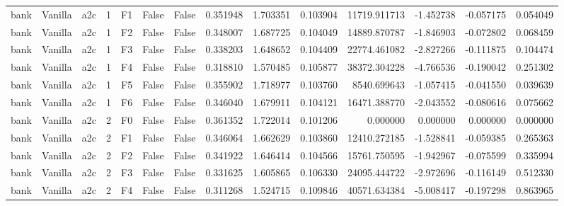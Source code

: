 \begin{tabular}{lllrlllrrrrrrr}
      bank & Vanilla &       a2c &     1 &  F1 &           False &            False &  0.351948 &  1.703351 & 0.103904 &     11719.911713 &          -1.452738 &       -0.057175 &            0.054049 \\
      bank & Vanilla &       a2c &     1 &  F2 &           False &            False &  0.348007 &  1.687725 & 0.104049 &     14889.870787 &          -1.846903 &       -0.072802 &            0.068459 \\
      bank & Vanilla &       a2c &     1 &  F3 &           False &            False &  0.338203 &  1.648652 & 0.104409 &     22774.461082 &          -2.827266 &       -0.111875 &            0.104474 \\
      bank & Vanilla &       a2c &     1 &  F4 &           False &            False &  0.318810 &  1.570485 & 0.105877 &     38372.304228 &          -4.766536 &       -0.190042 &            0.251302 \\
      bank & Vanilla &       a2c &     1 &  F5 &           False &            False &  0.355902 &  1.718977 & 0.103760 &      8540.699643 &          -1.057415 &       -0.041550 &            0.039639 \\
      bank & Vanilla &       a2c &     1 &  F6 &           False &            False &  0.346040 &  1.679911 & 0.104121 &     16471.388770 &          -2.043552 &       -0.080616 &            0.075662 \\
      bank & Vanilla &       a2c &     2 &  F0 &           False &            False &  0.361352 &  1.722014 & 0.101206 &         0.000000 &           0.000000 &        0.000000 &            0.000000 \\
      bank & Vanilla &       a2c &     2 &  F1 &           False &            False &  0.346064 &  1.662629 & 0.103860 &     12410.272185 &          -1.528841 &       -0.059385 &            0.265363 \\
      bank & Vanilla &       a2c &     2 &  F2 &           False &            False &  0.341922 &  1.646414 & 0.104566 &     15761.750595 &          -1.942967 &       -0.075599 &            0.335994 \\
      bank & Vanilla &       a2c &     2 &  F3 &           False &            False &  0.331625 &  1.605865 & 0.106330 &     24095.444722 &          -2.972696 &       -0.116149 &            0.512330 \\
      bank & Vanilla &       a2c &     2 &  F4 &           False &            False &  0.311268 &  1.524715 & 0.109846 &     40571.634384 &          -5.008417 &       -0.197298 &            0.863965 \\

\end{tabular}
